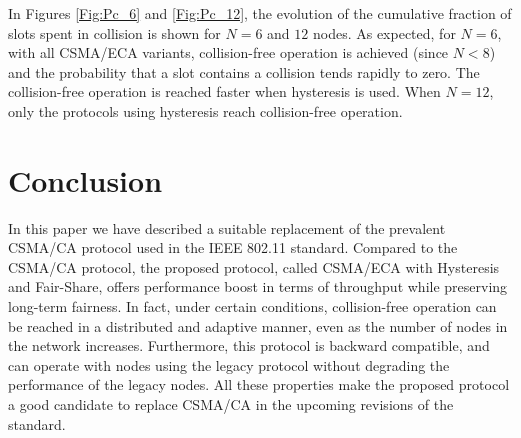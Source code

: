 \documentclass[conference]{IEEEtran}
\begin{document}
In Figures \ref{Fig:Pc_6} and \ref{Fig:Pc_12}, the evolution of the cumulative fraction of slots spent in collision is shown for $N = 6$ and $12$ nodes. As expected, for $N=6$, with all CSMA/ECA variants, collision-free operation is achieved (since $N<8$) and the probability that a slot contains a collision tends rapidly to zero. The collision-free operation is reached faster when hysteresis is used. When $N=12$, only the protocols using hysteresis reach collision-free operation. 

\section{Conclusion}

In this paper we have described a suitable replacement of the prevalent CSMA/CA protocol used in the IEEE 802.11 standard. Compared to the CSMA/CA protocol, the proposed protocol, called CSMA/ECA with Hysteresis and Fair-Share, offers performance boost in terms of throughput while preserving long-term fairness. In fact, under certain conditions, collision-free operation can be reached in a distributed and adaptive manner, even as the number of nodes in the network increases. Furthermore, this protocol is backward compatible, and can operate with nodes using the legacy protocol without degrading the performance of the legacy nodes. All these properties make the proposed protocol a good candidate to replace CSMA/CA in the upcoming revisions of the standard.

\end{document}
